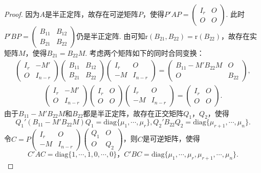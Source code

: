 \documentclass[../../main.tex]{subfiles}%
\begin{document}
\begin{proof}

因为\(A\)是半正定阵，故存在可逆矩阵\(P\)，使得\(P'AP=\begin{pmatrix}I_r&O\\O&O\end{pmatrix}\). 此时\(P'BP=\begin{pmatrix}B_{11}&B_{12}\\B_{21}&B_{22}\end{pmatrix}\)仍是半正定阵. 由可知\(\mathrm{r}(B_{21},B_{22})=\mathrm{r}(B_{22})\)，故存在实矩阵\(M\)，使得\(B_{21}=B_{22}M\). 考虑两个矩阵如下的同时合同变换：
\begin{align*}
\begin{pmatrix}I_r&-M'\\O&I_{n - r}\end{pmatrix}\begin{pmatrix}B_{11}&B_{12}\\B_{21}&B_{22}\end{pmatrix}\begin{pmatrix}I_r&O\\-M&I_{n - r}\end{pmatrix}=\begin{pmatrix}B_{11}-M'B_{22}M&O\\O&B_{22}\end{pmatrix},
\end{align*}
\begin{align*}
\begin{pmatrix}I_r&-M'\\O&I_{n - r}\end{pmatrix}\begin{pmatrix}I_r&O\\O&O\end{pmatrix}\begin{pmatrix}I_r&O\\-M&I_{n - r}\end{pmatrix}=\begin{pmatrix}I_r&O\\O&O\end{pmatrix}.
\end{align*}
由于\(B_{11}-M'B_{22}M\)和\(B_{22}\)都是半正定阵，故存在正交矩阵\(Q_1\)，\(Q_2\)，使得
\[
Q_1'(B_{11}-M'B_{22}M)Q_1 = \mathrm{diag}\{\mu_1,\cdots,\mu_r\},
Q_2'B_{22}Q_2 = \mathrm{diag}\{\mu_{r + 1},\cdots,\mu_n\}.
\]
令\(C = P\begin{pmatrix}I_r&O\\-M&I_{n - r}\end{pmatrix}\begin{pmatrix}Q_1&O\\O&Q_2\end{pmatrix}\)，则\(C\)是可逆矩阵，使得
\[
C'AC = \mathrm{diag}\{1,\cdots,1,0,\cdots,0\}，
C'BC = \mathrm{diag}\{\mu_1,\cdots,\mu_r,\mu_{r + 1},\cdots,\mu_n\}. 
\]

\end{proof}
\end{document}
